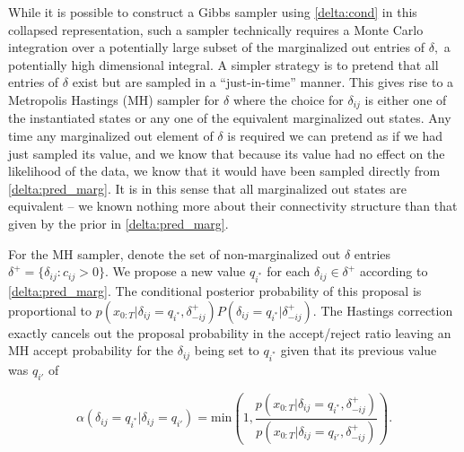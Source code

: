 While it is possible to construct a Gibbs sampler using \eqref{delta:cond} in this collapsed representation, such a sampler technically requires a Monte Carlo integration over a potentially large subset of the marginalized out entries of $\delta,$ a potentially high dimensional integral.  A simpler strategy is to pretend that all entries of $\delta$ exist but are sampled in a ``just-in-time'' manner.  
This gives rise to a Metropolis Hastings (MH) sampler for $\delta$ where the choice for $\delta_{ij}$ is either one of the instantiated states or any one of the equivalent marginalized out states.   Any time any marginalized out element of $\delta$ is required we can pretend as if we had just sampled its value, and we know that because its value had no effect on the likelihood of the data, we know that it would have been sampled directly from \eqref{delta:pred_marg}.  It is in this sense that all marginalized out states are equivalent -- we known nothing more about their connectivity structure than that given by the prior in \eqref{delta:pred_marg}.

   For the MH sampler, denote the set of non-marginalized out $\delta$ entries $\delta^+ = \{ \delta_{ij} : c_{ij} > 0\}.$ We propose a new value $q_{i^*}$ for each $\delta_{ij}\in\delta^+$ according to \eqref{delta:pred_marg}.  The conditional posterior probability of this proposal is proportional to $p(x_{0:T}|\delta_{ij}=q_{i^*},\delta^+_{-ij})P(\delta_{ij} = q_{i^*}|\delta^+_{-ij})$.  The Hastings correction exactly cancels out the proposal probability in the accept/reject ratio leaving an MH accept probability for the $\delta_{ij}$ being set to $q_{i^*}$ given that its previous value was $q_{i'}$ of

\begin{equation}
 \alpha(\delta_{ij}=q_{i^*} | \delta_{ij}=q_{i'}) =  \mathrm{min}\left(1,\frac{p(x_{0:T}|\delta_{ij}=q_{i^*},\delta_{-ij}^+)}{p(x_{0:T}|\delta_{ij}=q_{i'},\delta_{-ij}^+)}\right). \label{delta:mh}
\end{equation}

